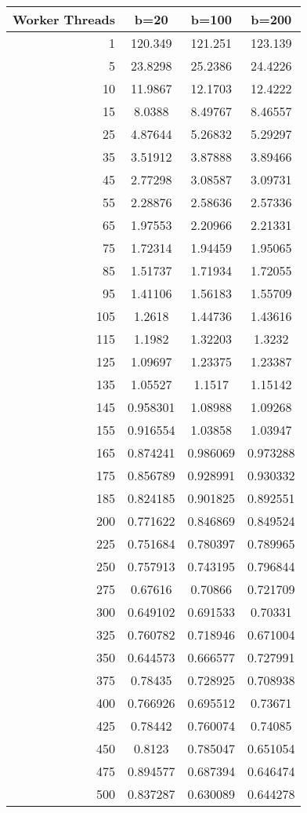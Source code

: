 \documentclass[10pt]{article}
\begin{document}
\begin{table}[h]
\begin{tabular}{r|c|c|c}
\multicolumn{1}{c|}{\textbf{Worker Threads}} & \multicolumn{1}{c|}{\textbf{b=20}} & \multicolumn{1}{c|}{\textbf{b=100}} & \multicolumn{1}{c}{\textbf{b=200}} \\ \hline
1 & 120.349 & 121.251 & 123.139 \\
5 & 23.8298 & 25.2386 & 24.4226 \\
10 & 11.9867 & 12.1703 & 12.4222 \\
15 & 8.0388 & 8.49767 & 8.46557 \\
25 & 4.87644 & 5.26832 & 5.29297 \\
35 & 3.51912 & 3.87888 & 3.89466 \\
45 & 2.77298 & 3.08587 & 3.09731 \\
55 & 2.28876 & 2.58636 & 2.57336 \\
65 & 1.97553 & 2.20966 & 2.21331 \\
75 & 1.72314 & 1.94459 & 1.95065 \\
85 & 1.51737 & 1.71934 & 1.72055 \\
95 & 1.41106 & 1.56183 & 1.55709 \\
105 & 1.2618 & 1.44736 & 1.43616 \\
115 & 1.1982 & 1.32203 & 1.3232 \\
125 & 1.09697 & 1.23375 & 1.23387 \\
135 & 1.05527 & 1.1517 & 1.15142 \\
145 & 0.958301 & 1.08988 & 1.09268 \\
155 & 0.916554 & 1.03858 & 1.03947 \\
165 & 0.874241 & 0.986069 & 0.973288 \\
175 & 0.856789 & 0.928991 & 0.930332 \\
185 & 0.824185 & 0.901825 & 0.892551 \\
200 & 0.771622 & 0.846869 & 0.849524 \\
225 & 0.751684 & 0.780397 & 0.789965 \\
250 & 0.757913 & 0.743195 & 0.796844 \\
275 & 0.67616 & 0.70866 & 0.721709 \\
300 & 0.649102 & 0.691533 & 0.70331 \\
325 & 0.760782 & 0.718946 & 0.671004 \\
350 & 0.644573 & 0.666577 & 0.727991 \\
375 & 0.78435 & 0.728925 & 0.708938 \\
400 & 0.766926 & 0.695512 & 0.73671 \\
425 & 0.78442 & 0.760074 & 0.74085 \\
450 & 0.8123 & 0.785047 & 0.651054 \\
475 & 0.894577 & 0.687394 & 0.646474 \\
500 & 0.837287 & 0.630089 & 0.644278
\end{tabular}
\end{table}
\end{document}
